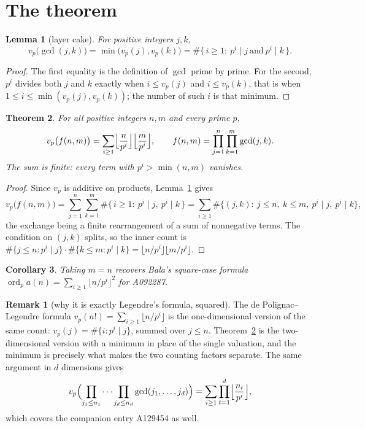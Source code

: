 \documentclass[11pt,a4paper]{article}
\theoremstyle{plain}
\newtheorem{theorem}{Theorem}
\newtheorem{lemma}[theorem]{Lemma}
\newtheorem{corollary}[theorem]{Corollary}
\theoremstyle{definition}
\newtheorem*{remark}{Remark}
\begin{document}
\section{The theorem}

\begin{lemma}[layer cake]\label{lem:layer}
For positive integers $j,k$,
\[
v_p\bigl(\gcd(j,k)\bigr)=\min\bigl(v_p(j),v_p(k)\bigr)
=\#\bigl\{\,i\ge1:\ p^i\mid j\ \text{and}\ p^i\mid k\,\bigr\}.
\]
\end{lemma}

\begin{proof}
The first equality is the definition of $\gcd$ prime by prime. For the second, $p^i$ divides
both $j$ and $k$ exactly when $i\le v_p(j)$ and $i\le v_p(k)$, that is when $1\le i\le
\min(v_p(j),v_p(k))$; the number of such $i$ is that minimum.
\end{proof}

\begin{theorem}\label{thm:rect}
For all positive integers $n,m$ and every prime $p$,
\[
v_p\bigl(f(n,m)\bigr)=\sum_{i\ge1}\Bigl\lfloor\frac{n}{p^i}\Bigr\rfloor
\Bigl\lfloor\frac{m}{p^i}\Bigr\rfloor,
\qquad f(n,m)=\prod_{j=1}^{n}\prod_{k=1}^{m}\gcd(j,k).
\]
The sum is finite: every term with $p^i>\min(n,m)$ vanishes.
\end{theorem}

\begin{proof}
Since $v_p$ is additive on products, Lemma~\ref{lem:layer} gives
\[
v_p\bigl(f(n,m)\bigr)=\sum_{j=1}^{n}\sum_{k=1}^{m}
\#\{\,i\ge1:\ p^i\mid j,\ p^i\mid k\,\}
=\sum_{i\ge1}\#\bigl\{(j,k):\ j\le n,\ k\le m,\ p^i\mid j,\ p^i\mid k\bigr\},
\]
the exchange being a finite rearrangement of a sum of nonnegative terms. The condition on
$(j,k)$ splits, so the inner count is
$\#\{j\le n: p^i\mid j\}\cdot\#\{k\le m: p^i\mid k\}
=\lfloor n/p^i\rfloor\lfloor m/p^i\rfloor$.
\end{proof}

\begin{corollary}
Taking $m=n$ recovers Bala's square-case formula
$\operatorname{ord}_p a(n)=\sum_{i\ge1}\lfloor n/p^i\rfloor^2$ for A092287.
\end{corollary}

\begin{remark}[why it is exactly Legendre's formula, squared]
The de Polignac--Legendre formula $v_p(n!)=\sum_{i\ge1}\lfloor n/p^i\rfloor$ is the
one-dimensional version of the same count: $v_p(j)=\#\{i: p^i\mid j\}$, summed over $j\le n$.
Theorem~\ref{thm:rect} is the two-dimensional version with a minimum in place of the single
valuation, and the minimum is precisely what makes the two counting factors separate. The same
argument in $d$ dimensions gives
\[
v_p\Bigl(\prod_{j_1\le n_1}\cdots\prod_{j_d\le n_d}\gcd(j_1,\dots,j_d)\Bigr)
=\sum_{i\ge1}\prod_{t=1}^{d}\Bigl\lfloor\frac{n_t}{p^i}\Bigr\rfloor,
\]
which covers the companion entry A129454 as well.
\end{remark}
\end{document}
